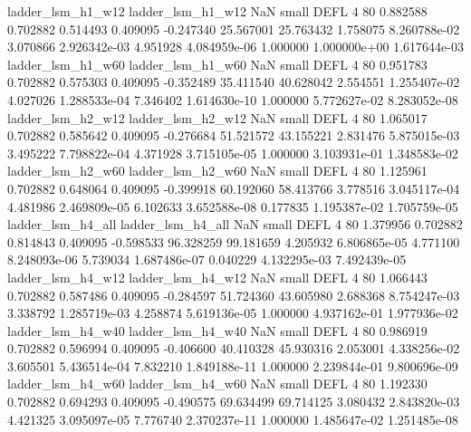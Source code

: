        ladder_lsm_h1_w12        ladder_lsm_h1_w12                   NaN      small     DEFL                 4 80 0.882588       0.702882 0.514493       0.409095   -0.247340     25.567001     25.763432     1.758075   8.260788e-02  3.070866 2.926342e-03     4.951928   4.084959e-06            1.000000    1.000000e+00        1.617644e-03
       ladder_lsm_h1_w60        ladder_lsm_h1_w60                   NaN      small     DEFL                 4 80 0.951783       0.702882 0.575303       0.409095   -0.352489     35.411540     40.628042     2.554551   1.255407e-02  4.027026 1.288533e-04     7.346402   1.614630e-10            1.000000    5.772627e-02        8.283052e-08
       ladder_lsm_h2_w12        ladder_lsm_h2_w12                   NaN      small     DEFL                 4 80 1.065017       0.702882 0.585642       0.409095   -0.276684     51.521572     43.155221     2.831476   5.875015e-03  3.495222 7.798822e-04     4.371928   3.715105e-05            1.000000    3.103931e-01        1.348583e-02
       ladder_lsm_h2_w60        ladder_lsm_h2_w60                   NaN      small     DEFL                 4 80 1.125961       0.702882 0.648064       0.409095   -0.399918     60.192060     58.413766     3.778516   3.045117e-04  4.481986 2.469809e-05     6.102633   3.652588e-08            0.177835    1.195387e-02        1.705759e-05
       ladder_lsm_h4_all        ladder_lsm_h4_all                   NaN      small     DEFL                 4 80 1.379956       0.702882 0.814843       0.409095   -0.598533     96.328259     99.181659     4.205932   6.806865e-05  4.771100 8.248093e-06     5.739034   1.687486e-07            0.040229    4.132295e-03        7.492439e-05
       ladder_lsm_h4_w12        ladder_lsm_h4_w12                   NaN      small     DEFL                 4 80 1.066443       0.702882 0.587486       0.409095   -0.284597     51.724360     43.605980     2.688368   8.754247e-03  3.338792 1.285719e-03     4.258874   5.619136e-05            1.000000    4.937162e-01        1.977936e-02
       ladder_lsm_h4_w40        ladder_lsm_h4_w40                   NaN      small     DEFL                 4 80 0.986919       0.702882 0.596994       0.409095   -0.406600     40.410328     45.930316     2.053001   4.338256e-02  3.605501 5.436514e-04     7.832210   1.849188e-11            1.000000    2.239844e-01        9.800696e-09
       ladder_lsm_h4_w60        ladder_lsm_h4_w60                   NaN      small     DEFL                 4 80 1.192330       0.702882 0.694293       0.409095   -0.490575     69.634499     69.714125     3.080432   2.843820e-03  4.421325 3.095097e-05     7.776740   2.370237e-11            1.000000    1.485647e-02        1.251485e-08
